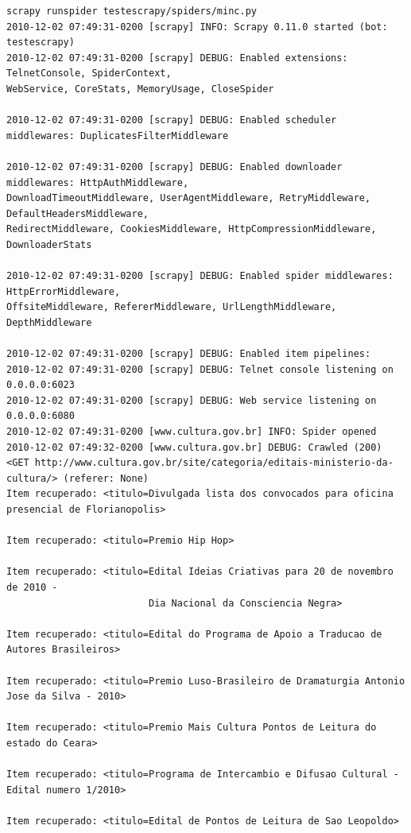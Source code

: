 \begin{lstlisting}[label=scrapy_wpt_minc]
scrapy runspider testescrapy/spiders/minc.py
2010-12-02 07:49:31-0200 [scrapy] INFO: Scrapy 0.11.0 started (bot: testescrapy)
2010-12-02 07:49:31-0200 [scrapy] DEBUG: Enabled extensions: TelnetConsole, SpiderContext, 
WebService, CoreStats, MemoryUsage, CloseSpider
															  
2010-12-02 07:49:31-0200 [scrapy] DEBUG: Enabled scheduler middlewares: DuplicatesFilterMiddleware

2010-12-02 07:49:31-0200 [scrapy] DEBUG: Enabled downloader middlewares: HttpAuthMiddleware, 
DownloadTimeoutMiddleware, UserAgentMiddleware, RetryMiddleware, DefaultHeadersMiddleware, 
RedirectMiddleware, CookiesMiddleware, HttpCompressionMiddleware, DownloaderStats

2010-12-02 07:49:31-0200 [scrapy] DEBUG: Enabled spider middlewares: HttpErrorMiddleware, 
OffsiteMiddleware, RefererMiddleware, UrlLengthMiddleware, DepthMiddleware
																     
2010-12-02 07:49:31-0200 [scrapy] DEBUG: Enabled item pipelines: 
2010-12-02 07:49:31-0200 [scrapy] DEBUG: Telnet console listening on 0.0.0.0:6023
2010-12-02 07:49:31-0200 [scrapy] DEBUG: Web service listening on 0.0.0.0:6080
2010-12-02 07:49:31-0200 [www.cultura.gov.br] INFO: Spider opened
2010-12-02 07:49:32-0200 [www.cultura.gov.br] DEBUG: Crawled (200) 
<GET http://www.cultura.gov.br/site/categoria/editais-ministerio-da-cultura/> (referer: None)
Item recuperado: <titulo=Divulgada lista dos convocados para oficina presencial de Florianopolis> 

Item recuperado: <titulo=Premio Hip Hop> 

Item recuperado: <titulo=Edital Ideias Criativas para 20 de novembro de 2010 - 
						 Dia Nacional da Consciencia Negra> 

Item recuperado: <titulo=Edital do Programa de Apoio a Traducao de Autores Brasileiros> 

Item recuperado: <titulo=Premio Luso-Brasileiro de Dramaturgia Antonio Jose da Silva - 2010> 

Item recuperado: <titulo=Premio Mais Cultura Pontos de Leitura do estado do Ceara> 

Item recuperado: <titulo=Programa de Intercambio e Difusao Cultural - Edital numero 1/2010> 

Item recuperado: <titulo=Edital de Pontos de Leitura de Sao Leopoldo> 


\end{lstlisting}
